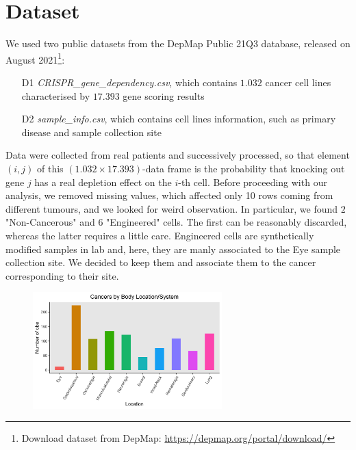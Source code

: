 \documentclass[a4paper,11pt, oneside]{article}  %
\begin{document}
\section{Dataset}
We used two public datasets from the DepMap Public 21Q3 database,  released on August 2021\footnote{Download dataset from DepMap:  \url{https://depmap.org/portal/download/}}:
\begin{itemize}
	\item[D1] \textit{CRISPR\_gene\_dependency.csv},  which contains $1.032$ cancer cell lines characterised by $17.393$ gene scoring results
	\item[D2] \textit{sample\_info.csv}, which contains cell lines information,  such as primary disease and sample collection site
\end{itemize}
Data were collected from real patients and successively processed,  so that element $(i, j)$ of this $(1.032 \times 17.393)$-data frame is the probability that knocking out gene $j$ has a real depletion effect on the $i$-th cell.
Before proceeding with our analysis, we removed missing values, which affected only 10 rows coming from different tumours, and we looked for weird observation. In particular, we found $2$ "Non-Cancerous" and $6$ "Engineered" cells. The first can be reasonably discarded, whereas the latter requires a little care. Engineered cells are synthetically modified samples in lab and, here, they are manly associated to the Eye sample collection site. We decided to keep them and associate them to the cancer corresponding to their site. \\

\begin{figure}
	\includegraphics[width=0.65\textwidth]{plot1.png}
	\label{fig1}
\end{figure}
\end{document}
